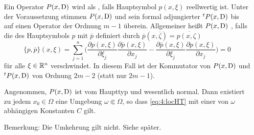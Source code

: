 Ein Operator $P(x,\mathrm D)$ wird als  , falls Hauptsymbol $p(x,\xi)$ reellwertig ist. Unter der Voraussetzung stimmen $P(x,\mathrm D)$ und sein formal adjungierter ${}^tP(x,\mathrm D)$ bis auf einen Operator der Ordnung $m-1$ überein. Allgemeiner heißt $P(x,\mathrm D)$ , falls die   des Hauptsymbols $p$ mit $\overline p$ definiert durch $\overline p(x, \overline\zeta) = \overline{p(x,\zeta)}$
\begin{equation}
    \{ p,\overline p\} (x,\xi) = \sum_{j=1}^n \bigg(\frac{\partial p(x,\xi)}{\partial \xi_j} \frac{\partial \overline p (x,\xi)}{\partial x_j} - \frac{\partial \overline p(x,\xi)}{\partial \xi_j}\frac{\partial  p(x,\xi)}{\partial x_j} \bigg)    = 0 
\end{equation}
für alle $\xi\in\mathbb R^n$ verschwindet. In diesem Fall ist der Kommutator von $P(x,\mathrm D)$ und ${}^tP(x,\mathrm D)$ von Ordnung $2m-2$ (statt nur $2m-1$).

\begin{thm}
Angenommen, $P(x,\mathrm D)$ ist vom Haupttyp und wesentlich normal. Dann existiert zu jedem $x_0\in\Omega$ eine Umgebung $\omega\Subset\Omega$, so dass
\eqref{eq:4:locHT} mit einer von $\omega$ abhängigen Konstanten $C$ gilt.
\end{thm}
Bemerkung: Die Umkehrung gilt nicht. Siehe später.


